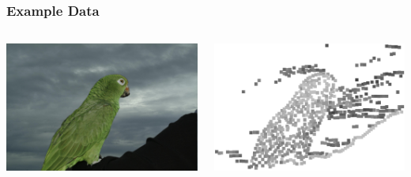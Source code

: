 \documentclass{beamer}
\begin{document}
\begin{frame}
\frametitle{Example Data}
\begin{columns}
\begin{column}{0.5\textwidth}
    \begin{center}
     \includegraphics[width=.9\textwidth]{mask_real}
     \end{center}
\end{column}
\begin{column}{0.5\textwidth}
    \begin{center}
     \includegraphics[width=.9\textwidth]{mask_2}
     \end{center}

\end{column}
\end{columns}
\end{frame}
\end{document}
